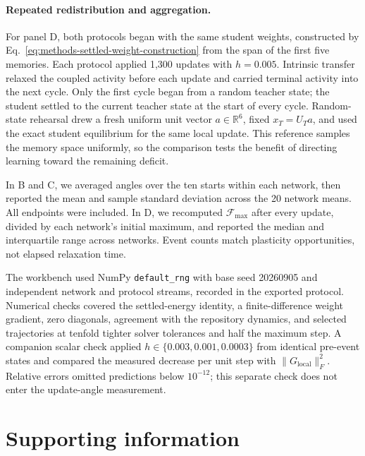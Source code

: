 \documentclass[10pt,letterpaper]{article}
\theoremstyle{plain}
\theoremstyle{remark}
\begin{document}
\paragraph{Repeated redistribution and aggregation.}
For panel D, both protocols began with the same student weights, constructed by Eq.~\eqref{eq:methods-settled-weight-construction} from the span of the first five memories. Each protocol applied 1,300 updates with \(h=0.005\). Intrinsic transfer relaxed the coupled activity before each update and carried terminal activity into the next cycle. Only the first cycle began from a random teacher state; the student settled to the current teacher state at the start of every cycle. Random-state rehearsal drew a fresh uniform unit vector \(a\in\mathbb R^6\), fixed \(x_T=U_Ta\), and used the exact student equilibrium for the same local update. This reference samples the memory space uniformly, so the comparison tests the benefit of directing learning toward the remaining deficit.

In B and C, we averaged angles over the ten starts within each network, then reported the mean and sample standard deviation across the 20 network means. All endpoints were included. In D, we recomputed \(\mathcal F_{\max}\) after every update, divided by each network's initial maximum, and reported the median and interquartile range across networks. Event counts match plasticity opportunities, not elapsed relaxation time.

The workbench used NumPy \texttt{default\_rng} with base seed 20260905 and independent network and protocol streams, recorded in the exported protocol. Numerical checks covered the settled-energy identity, a finite-difference weight gradient, zero diagonals, agreement with the repository dynamics, and selected trajectories at tenfold tighter solver tolerances and half the maximum step. A companion scalar check applied \(h\in\{0.003,0.001,0.0003\}\) from identical pre-event states and compared the measured decrease per unit step with \(\|G_{\mathrm{local}}\|_F^2\). Relative errors omitted predictions below \(10^{-12}\); this separate check does not enter the update-angle measurement.

\section*{Supporting information}
\end{document}
